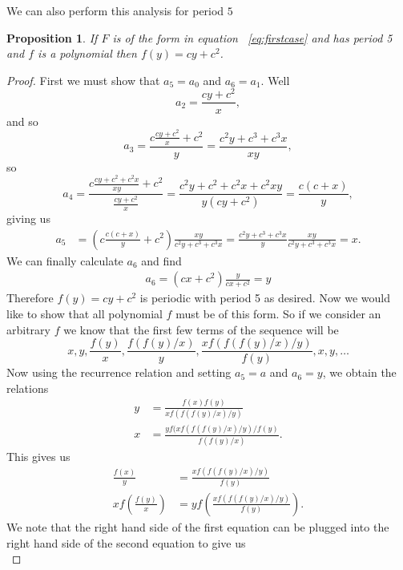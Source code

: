 \documentclass[12pt]{article}
\newtheorem{proposition}{Proposition}
\begin{document}
We can also perform this analysis for period $5$  
\begin{proposition}
If $F$ is of the form in equation ~\ref{eq:firstcase} and has period 5 and $f$ is a polynomial then $f(y) = cy+c^2$. 
\end{proposition}
\begin{proof}
First we must show that $a_5=a_0$ and $a_6=a_1$. Well 
\begin{equation*}
a_2 = \frac{cy+c^2}{x},
\end{equation*}
and so 
\begin{equation*}
a_3 = \frac{ c \frac{cy+c^2}{x} +c^2}{y} = \frac{c^2y + c^3+c^3x}{xy},
\end{equation*}
so
\begin{equation*}
a_4  = \frac{c \frac{cy + c^2+c^2x}{xy} +c^2}{\frac{cy+c^2}{x}} = \frac{c^2y+c^2+c^2x+c^2xy}{y(cy+c^2)} = \frac{c(c+x)}{y},
\end{equation*}
giving us 
\begin{align*}
a_5 &=\left(c \frac{c(c+x)}{y} + c^2\right) \frac{xy}{c^2y+c^3+c^3x} = \frac{c^2y+c^3+c^3x}{y} \frac{xy}{c^2y+c^3+c^3x}= x.
\end{align*}
We can finally calculate $a_6$ and find 
\begin{align*}
a_6 = (cx + c^2) \frac{y}{cx+c^2} = y
\end{align*}
Therefore $f(y)=cy+c^2$ is periodic with period 5 as desired. Now we would like to show that all polynomial $f$ must be of this form. So if we consider an arbitrary $f$ we know that the first few terms of the sequence will be 
\begin{equation*}
x,y, \frac{f(y)}{x}, \frac{f(f(y)/x)}{y}, \frac{xf( f(f(y)/x)/y)}{f(y)}, x, y, \ldots
\end{equation*}
Now using the recurrence relation and setting $a_5=a$ and $a_6=y$, we obtain the relations
\begin{align*}
y &= \frac{ f(x)f(y)}{xf(f(f(y)/x)/y)} \\
x &= \frac{y f( xf(f(f(y)/x)/y)/f(y)}{f(f(y)/x)}.
\end{align*}
This gives us 
\begin{align*}
 \frac{f(x)}{y} &= \frac{ xf(f(f(y)/x)/y)}{f(y)} \\
xf\left(\frac{f(y)}{x}\right) &= y f\left( \frac{ xf(f(f(y)/x)/y)}{f(y)}\right).
\end{align*}
We note that the right hand side of the first equation can be plugged into the right hand side of the second equation to give us 
\begin{equation}

\end{equation}
\end{proof}
\end{document}
